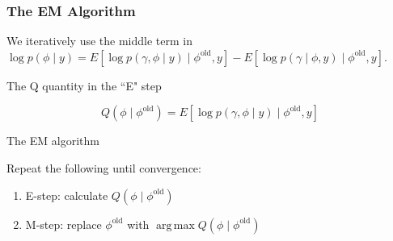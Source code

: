 \documentclass{beamer}
\DeclareMathOperator*{\argmax}{arg\,max}
\begin{document}
\begin{frame}[fragile]
\frametitle{The EM Algorithm}

We iteratively use the middle term in
$\log p(\phi \mid y) =  E\left[ \log p(\gamma, \phi \mid y) \mid \phi^{\text{old}}, y \right] - E\left[\log p(\gamma \mid \phi, y) \mid \phi^{\text{old}}, y \right]$.

\begin{block}{The Q quantity in the ``E" step}

$$
Q(\phi \mid \phi^{\text{old}}) = E\left[ \log p(\gamma, \phi \mid y) \mid \phi^{\text{old}}, y \right]
$$
\end{block}
\pause

\begin{block}{The EM algorithm}

Repeat the following until convergence:
\begin{enumerate}
\item E-step: calculate $Q(\phi \mid \phi^{\text{old}})$
\item M-step: replace $\phi^{\text{old}}$ with $\argmax Q(\phi \mid \phi^{\text{old}})$
\end{enumerate}
\end{block}
\end{frame}
\end{document}
